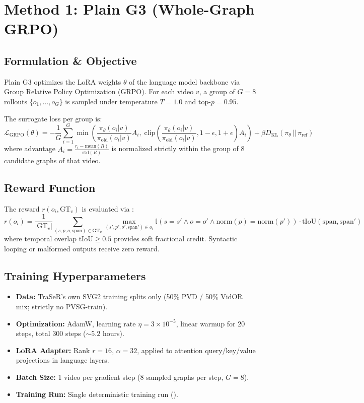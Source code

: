 \documentclass[11pt,a4paper]{article}
\begin{document}
\section{Method 1: Plain G3 (Whole-Graph GRPO)}

\subsection{Formulation \& Objective}
Plain G3 optimizes the LoRA weights $\theta$ of the language model backbone via Group Relative Policy Optimization (GRPO). For each video $v$, a group of $G=8$ rollouts $\{o_1, \dots, o_G\}$ is sampled under temperature $T=1.0$ and top-$p=0.95$. 

The surrogate loss per group is:
\begin{equation}
\mathcal{L}_{\text{GRPO}}(\theta) = -\frac{1}{G} \sum_{i=1}^G \min \left( \frac{\pi_\theta(o_i|v)}{\pi_{\text{old}}(o_i|v)} A_i, \; \text{clip}\left(\frac{\pi_\theta(o_i|v)}{\pi_{\text{old}}(o_i|v)}, 1-\epsilon, 1+\epsilon\right) A_i \right) + \beta D_{\text{KL}}(\pi_\theta \,||\, \pi_{\text{ref}})
\end{equation}
where advantage $A_i = \frac{r_i - \text{mean}(R)}{\text{std}(R)}$ is normalized strictly within the group of 8 candidate graphs of that video.

\subsection{Reward Function}
The reward $r(o_i, \text{GT}_v)$ is evaluated via :
\begin{equation}
r(o_i) = \frac{1}{|\text{GT}_v|} \sum_{(s, p, o, \text{span}) \in \text{GT}_v} \max_{(s', p', o', \text{span}') \in o_i} \mathbb{I}(s=s' \land o=o' \land \text{norm}(p)=\text{norm}(p')) \cdot \text{tIoU}(\text{span}, \text{span}')
\end{equation}
where temporal overlap $\text{tIoU} \ge 0.5$ provides soft fractional credit. Syntactic looping or malformed outputs receive zero reward.

\subsection{Training Hyperparameters}
\begin{itemize}
    \item \textbf{Data:} TraSeR's own SVG2 training splits only (50\% PVD / 50\% VidOR mix; strictly no PVSG-train).
    \item \textbf{Optimization:} AdamW, learning rate $\eta = 3\times 10^{-5}$, linear warmup for 20 steps, total 300 steps ($\sim 5.2$ hours).
    \item \textbf{LoRA Adapter:} Rank $r=16$, $\alpha=32$, applied to attention query/key/value projections in language layers.
    \item \textbf{Batch Size:} 1 video per gradient step ($8$ sampled graphs per step, $G=8$).
    \item \textbf{Training Run:} Single deterministic training run ().
\end{itemize}
\end{document}
